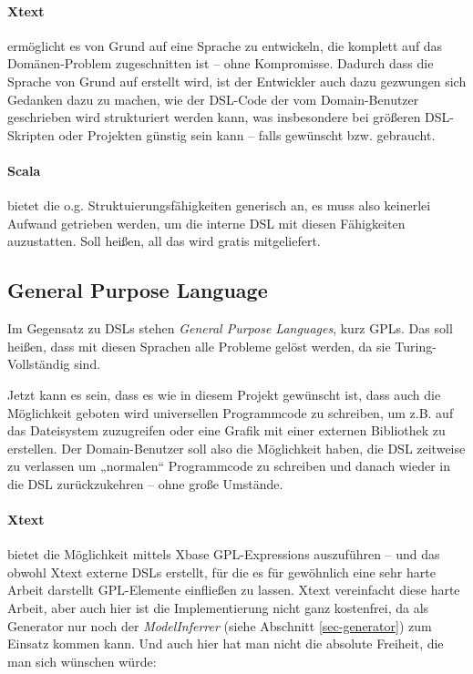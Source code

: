 \paragraph{Xtext} ermöglicht es von Grund auf eine Sprache zu entwickeln,
die komplett auf das Domänen-Problem zugeschnitten ist -- ohne Kompromisse.
Dadurch dass die Sprache von Grund auf erstellt wird, ist der Entwickler
auch dazu gezwungen sich Gedanken dazu zu machen, wie der DSL-Code
der vom Domain-Benutzer geschrieben wird strukturiert werden kann,
was insbesondere bei größeren DSL-Skripten oder
Projekten günstig sein kann -- falls gewünscht bzw. gebraucht.

\paragraph{Scala} bietet die o.g. Struktuierungsfähigkeiten generisch an,
es muss also keinerlei Aufwand getrieben werden, um die interne DSL mit
diesen Fähigkeiten auzustatten. Soll heißen, all das wird gratis mitgeliefert.


\subsection{General Purpose Language}\label{sec-gpl}

Im Gegensatz zu DSLs stehen \emph{General Purpose Languages}, kurz GPLs.
Das soll heißen, dass mit diesen Sprachen alle Probleme gelöst werden, da
sie Turing-Vollständig sind.

Jetzt kann es sein, dass es wie in diesem Projekt gewünscht ist, dass
auch die Möglichkeit geboten wird universellen Programmcode zu schreiben,
um z.B. auf das Dateisystem zuzugreifen oder eine Grafik mit einer
externen Bibliothek zu erstellen. Der Domain-Benutzer soll also die
Möglichkeit haben, die DSL zeitweise zu verlassen um „normalen“ Programmcode
zu schreiben und danach wieder in die DSL zurückzukehren -- ohne große
Umstände.

\paragraph{Xtext} bietet die Möglichkeit mittels Xbase GPL-Expressions
auszuführen -- und das obwohl Xtext externe DSLs erstellt, für die es für
gewöhnlich eine sehr harte Arbeit darstellt GPL-Elemente einfließen zu lassen.
Xtext vereinfacht diese harte Arbeit, aber auch hier ist die Implementierung
nicht ganz kostenfrei, da als Generator nur noch der \emph{ModelInferrer}
(siehe Abschnitt \ref{sec-generator}) zum Einsatz kommen kann.
Und auch hier hat man nicht die absolute Freiheit, die man sich wünschen
würde:

